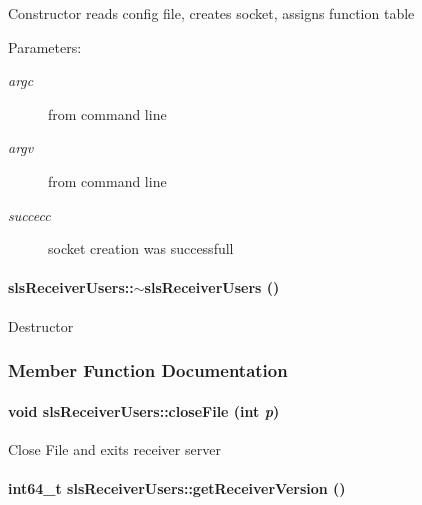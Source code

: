 Constructor reads config file, creates socket, assigns function table \begin{Desc}
\item[Parameters:]
\begin{description}
\item[{\em argc}]from command line \item[{\em argv}]from command line \item[{\em succecc}]socket creation was successfull \end{description}
\end{Desc}
\hypertarget{classslsReceiverUsers_9b45943d81ce7a09543aa446de857cb0}{
\paragraph[$\sim$slsReceiverUsers]{\setlength{\rightskip}{0pt plus 5cm}sls\-Receiver\-Users::$\sim$sls\-Receiver\-Users ()}\hfill}
\label{classslsReceiverUsers_9b45943d81ce7a09543aa446de857cb0}


Destructor 

\subsubsection{Member Function Documentation}
\hypertarget{classslsReceiverUsers_bad0b3265826da2d9ebf48e59e9d5787}{
\paragraph[closeFile]{\setlength{\rightskip}{0pt plus 5cm}void sls\-Receiver\-Users::close\-File (int {\em p})}\hfill}
\label{classslsReceiverUsers_bad0b3265826da2d9ebf48e59e9d5787}


Close File and exits receiver server \hypertarget{classslsReceiverUsers_f206092e2744e12ce6b717f4181d91a2}{
\paragraph[getReceiverVersion]{\setlength{\rightskip}{0pt plus 5cm}int64\_\-t sls\-Receiver\-Users::get\-Receiver\-Version ()}\hfill}
\label{classslsReceiverUsers_f206092e2744e12ce6b717f4181d91a2}


